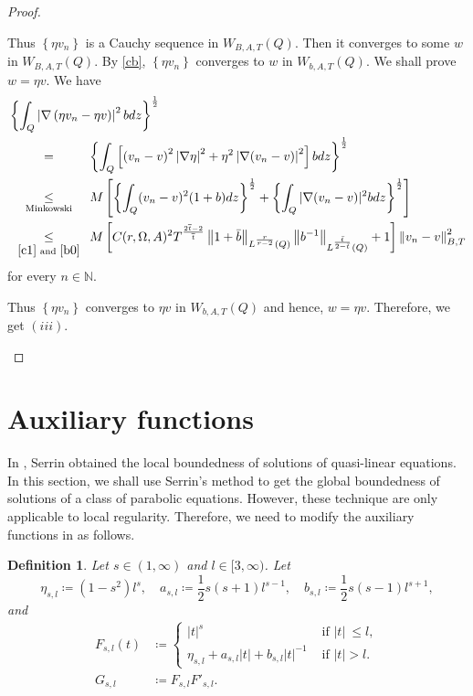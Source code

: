 \documentclass[11pt, a4paper]{article}
\newtheorem{definition}{Definition}%
\numberwithin{equation}{section}
\newcommand{\coex}[2][\hphantom{longexplanation}]{%
  \underset{{#1}}{\overset{\hphantom{longexplanation}}{#2}}
}
\newcommand{\NN}{{\mathbb N}}
\newcommand{\abs}[1]{\left\lvert #1\right\rvert}
\newcommand{\norm}[1]{\left\lVert #1\right\rVert}
\begin{document}
\begin{proof}
\begin{itemize}[wide]
 Thus $\left\{\eta v_{n}\right\}$ is a Cauchy sequence in
 $W_{B,A,T}(Q)$. Then it converges to some $w$ in $W_{B,A,T}(Q)$. By \eqref{cb}, $\left\{\eta v_{n}\right\}$ converges to $w$ in $W_{b,A,T}(Q)$. We shall prove $w=\eta v$. We have
 \begin{align*}
 &\left\{\int_{Q}\abs{\nabla \left(\eta v_{n}-\eta v
   \right)}^{2}bdz\right\}^{\frac{1}{2}}\\
   &\coex{=} \left\{\int_{Q} \left[\left(v_{n}-v
     \right)^{2}\abs{\nabla\eta}^{2}+\eta^{2}\abs{\nabla
     (v_{n}-v)}^{2} \right]bdz\right\}^{\frac{1}{2}}\\
 &\coex[\text{Minkowski}]{\le}
   M \left[\left\{\int_{Q}(v_{n}-v)^{2}(1+b)dz\right\}^{\frac{1}{2}}
 +\left\{\int_{Q}|\nabla(v_{n}-v)|^{2}bdz\right\}^{\frac{1}{2}}
   \right]\\
 &\coex[\eqref{c1} \text{ and }\eqref{b0}]{\le} M
   \left[C(r,\Omega,A)^{2}T^{\frac{2\overline{t}-2}{\overline{t}}}\norm{1
        + \bar{b}}_{L^{\frac{r}{r-2}}(Q)}
        \norm{b^{-1}}_{L^{\frac{\bar{t}}{2-\bar{t}}}(Q)} +1 \right]\norm{v_{n}-v}^{2}_{B,T}
 \end{align*} 
 for every $n\in\NN$.
 
 Thus $\left\{\eta v_{n}\right\}$ converges to $\eta v$ in
 $W_{b,A,T}(Q)$ and hence, $w=\eta v$. Therefore, we get $(iii)$.
 \end{itemize}
 \end{proof}
 \section{Auxiliary functions}\label{aux}
 
 In \cite{serrinLocalBehaviorSolutions1964}, Serrin obtained the local
 boundedness of solutions of quasi-linear equations. In this section,
 we shall use Serrin's method to get the global boundedness of
 solutions of a class of parabolic equations. However, these technique
 are only applicable to local regularity. Therefore, we need to modify
 the auxiliary functions in \cite{serrinLocalBehaviorSolutions1964} as
 follows.
\begin{definition} Let  $s \in (1,\infty)$ and $l \in
  [3,\infty)$. Let
  $$\eta_{s,l}\coloneqq (1-s^{2})l^{s},\quad a_{s,l}\coloneqq \frac{1}{2}s(s+1)l^{s-1},\quad b_{s,l}\coloneqq \frac{1}{2} s(s-1)l^{s+1},$$  and 
  \begin{align}
    F_{s,l}(t)
    &\coloneqq
    \begin{cases}
|t|^{s}&\text{ if } |t| ~\le l,\\
\eta_{s,l}+a_{s,l}|t| +b_{s,l}|t|^{-1}&\text{ if } |t| > l.
\end{cases}
\label{f1b}\\
G_{s,l}&\coloneqq F_{s,l}F'_{s,l}.
\label{f1b2}
\end{align}
\label{def61}
\end{definition}
\end{document}
